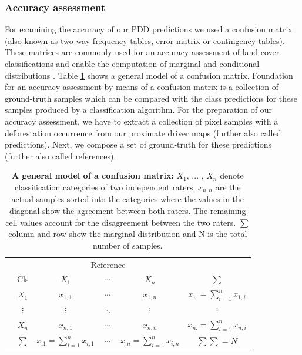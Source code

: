 		\subsubsection{Accuracy assessment}
			For examining the accuracy of our \ac{PDD} predictions we used a confusion matrix (also known as two-way frequency tables, error matrix or contingency tables). These matrices are commonly used for an accuracy assessment of land cover classifications and enable the computation of marginal and conditional distributions \citep{Congalton1991,Foody2002}. Table \ref{tab:methods_confusion_matrix} shows a general model of a confusion matrix. Foundation for an accuracy assessment by means of a confusion matrix is a collection of ground-truth samples which can be compared with the class predictions for these samples produced by a classification algorithm. For the preparation of our accuracy assessment, we have to extract a collection of pixel samples with a deforestation occurrence from our proximate driver maps (further also called predictions). Next, we compose a set of ground-truth for these predictions (further also called references).
			\begin{table}[ht]
				\centering
				\caption[A general model of a confusion matrix]{\textbf{A general model of a confusion matrix:} $X_1$, ... , $X_n$ denote classification categories of two independent raters. $x_{n,n}$ are the actual samples sorted into the categories where the values in the diagonal show the agreement between both raters. The remaining cell values account for the disagreement between the two raters. $\sum$ column and row show the marginal distribution and N is the total number of samples.}
				\label{tab:methods_confusion_matrix}
				\begin{tabular}{lccccc}
					\hline
					& & \multicolumn{3}{c}{Reference} & \\
					& Cls & $X_1$ & $\cdots$ & $X_n$ & $\sum$ \\\hline
					\multirow{4}{*}{\STAB{\rotatebox[origin=c]{90}{Predict}}}
					& $X_1$ & $x_{1,1}$ & $\cdots$ & $x_{1,n}$ & $x_{1.}=
					\displaystyle\sum_{i=1}^{n} x_{1,i}$ \\ 
					& $\vdots$ & $\vdots$ & $\ddots$ & $\vdots$ & $\vdots$ \\ 
					& $X_n$ & $x_{n,1}$ & $\cdots$ & $x_{n,n}$ & $x_{n.}=\displaystyle\sum_{i=1}^{n}x_{n,i}$ \\\hline 
					& $\sum$ & $x_{.1}=\displaystyle\sum_{i=1}^{n}x_{i,1}$ & $\cdots$ & $x_{.n}=\displaystyle\sum_{i=1}^{n}x_{i,n}$ & $\sum\sum=N$ \\\hline
				\end{tabular}
			\end{table}

